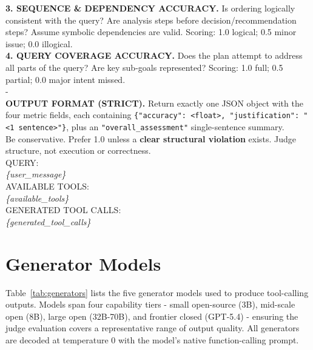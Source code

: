 \begin{promptbox}
\textbf{3. SEQUENCE \& DEPENDENCY ACCURACY.} Is ordering logically consistent with the query? Are analysis steps before decision/recommendation steps? Assume symbolic dependencies are valid. Scoring: 1.0 logical; 0.5 minor issue; 0.0 illogical.\\[3pt]
\textbf{4. QUERY COVERAGE ACCURACY.} Does the plan attempt to address all parts of the query? Are key sub-goals represented? Scoring: 1.0 full; 0.5 partial; 0.0 major intent missed.\\[4pt]
-\\
\textbf{OUTPUT FORMAT (STRICT).} Return exactly one JSON object with the four metric fields, each containing \texttt{\{"accuracy": <float>, "justification": "<1 sentence>"\}}, plus an \texttt{"overall\_assessment"} single-sentence summary.\\[4pt]
Be conservative. Prefer 1.0 unless a \textbf{clear structural violation} exists. Judge structure, not execution or correctness.\\[6pt]
QUERY:\\
\textit{\{user\_message\}}\\[4pt]
AVAILABLE TOOLS:\\
\textit{\{available\_tools\}}\\[4pt]
GENERATED TOOL CALLS:\\
\textit{\{generated\_tool\_calls\}}
\end{promptbox}

\section{Generator Models}
\label{app:generators}

Table~\ref{tab:generators} lists the five generator models used to produce tool-calling outputs. Models span four capability tiers - small open-source (3B), mid-scale open (8B), large open (32B-70B), and frontier closed (GPT-5.4) - ensuring the judge evaluation covers a representative range of output quality. All generators are decoded at temperature $0$ with the model's native function-calling prompt.

